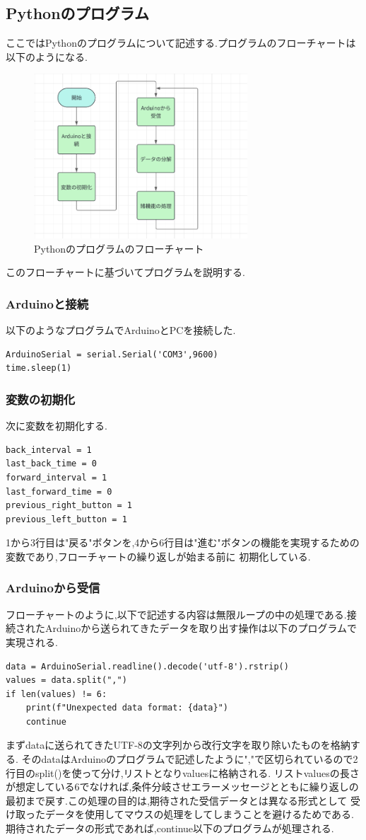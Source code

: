 \documentclass[dvipdfmx]{jarticle}
\begin{document}
\subsection{Pythonのプログラム}
ここではPythonのプログラムについて記述する.プログラムのフローチャートは以下のようになる.
\begin{figure}[h]
    \centering
    \includegraphics[width=8cm]{python_hurotya.png}
    \caption{Pythonのプログラムのフローチャート}
\end{figure}
このフローチャートに基づいてプログラムを説明する.
\subsubsection{Arduinoと接続}
以下のようなプログラムでArduinoとPCを接続した.
\begin{lstlisting}
ArduinoSerial = serial.Serial('COM3',9600)
time.sleep(1)
\end{lstlisting}

\subsubsection{変数の初期化}
次に変数を初期化する.
\begin{lstlisting}
back_interval = 1
last_back_time = 0
forward_interval = 1
last_forward_time = 0
previous_right_button = 1
previous_left_button = 1
\end{lstlisting}
1から3行目は"戻る"ボタンを,4から6行目は"進む"ボタンの機能を実現するための変数であり,フローチャートの繰り返しが始まる前に
初期化している.
\subsubsection{Arduinoから受信}
フローチャートのように,以下で記述する内容は無限ループの中の処理である.接続されたArduinoから送られてきたデータを取り出す操作は以下のプログラムで実現される.
\begin{lstlisting}
data = ArduinoSerial.readline().decode('utf-8').rstrip()
values = data.split(",")
if len(values) != 6:
    print(f"Unexpected data format: {data}")
    continue
\end{lstlisting}
まずdataに送られてきたUTF-8の文字列から改行文字を取り除いたものを格納する.
そのdataはArduinoのプログラムで記述したように","で区切られているので2行目のsplit()を使って分け,リストとなりvaluesに格納される.
リストvaluesの長さが想定している6でなければ,条件分岐させエラーメッセージとともに繰り返しの最初まで戻す.この処理の目的は,期待された受信データとは異なる形式として
受け取ったデータを使用してマウスの処理をしてしまうことを避けるためである.期待されたデータの形式であれば,continue以下のプログラムが処理される.
\end{document}
